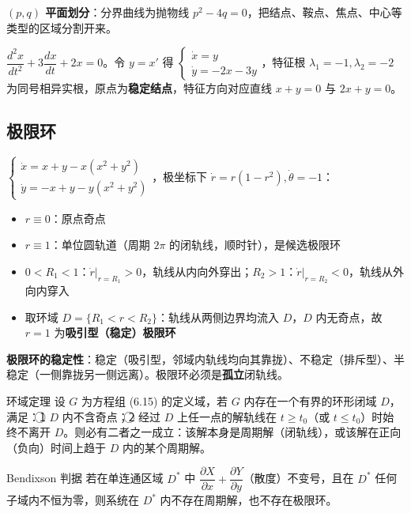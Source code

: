 \textbf{$(p,q)$ 平面划分}：分界曲线为抛物线 $p^2 - 4q = 0$，把结点、鞍点、焦点、中心等类型的区域分割开来。

\begin{example}
$\dfrac{d^2x}{dt^2} + 3\dfrac{dx}{dt} + 2x = 0$。令 $y = x'$ 得 $\begin{cases} \dot{x} = y \\ \dot{y} = -2x - 3y \end{cases}$，特征根 $\lambda_1 = -1, \lambda_2 = -2$ 为同号相异实根，原点为\textbf{稳定结点}，特征方向对应直线 $x + y = 0$ 与 $2x + y = 0$。
\end{example}

\subsection{极限环}

\begin{example}
$\begin{cases} \dot{x} = x + y - x(x^2+y^2) \\ \dot{y} = -x + y - y(x^2+y^2) \end{cases}$，极坐标下 $\dot{r} = r(1-r^2), \dot{\theta} = -1$：
\begin{itemize}
    \item $r \equiv 0$：原点奇点
    \item $r \equiv 1$：单位圆轨道（周期 $2\pi$ 的闭轨线，顺时针），是候选极限环
    \item $0 < R_1 < 1$：$\dot{r}|_{r=R_1} > 0$，轨线从内向外穿出；$R_2 > 1$：$\dot{r}|_{r=R_2} < 0$，轨线从外向内穿入
    \item 取环域 $D = \{R_1 < r < R_2\}$：轨线从两侧边界均流入 $D$，$D$ 内无奇点，故 $r = 1$ 为\textbf{吸引型（稳定）极限环}
\end{itemize}
\end{example}

\textbf{极限环的稳定性}：稳定（吸引型，邻域内轨线均向其靠拢）、不稳定（排斥型）、半稳定（一侧靠拢另一侧远离）。极限环必须是\textbf{孤立}闭轨线。

\begin{myTheorem}{环域定理}
设 $G$ 为方程组 (6.15) 的定义域，若 $G$ 内存在一个有界的环形闭域 $D$，满足：\textcircled{1} $D$ 内不含奇点；\textcircled{2} 经过 $D$ 上任一点的解轨线在 $t \ge t_0$（或 $t \le t_0$）时始终不离开 $D$。则必有二者之一成立：该解本身是周期解（闭轨线），或该解在正向（负向）时间上趋于 $D$ 内的某个周期解。
\end{myTheorem}

\begin{myTheorem}{Bendixson 判据}
若在单连通区域 $D^*$ 中 $\dfrac{\partial X}{\partial x} + \dfrac{\partial Y}{\partial y}$（散度）不变号，且在 $D^*$ 任何子域内不恒为零，则系统在 $D^*$ 内不存在周期解，也不存在极限环。
\end{myTheorem}

